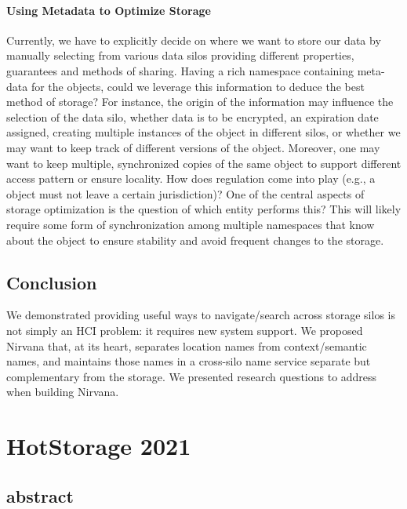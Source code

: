 \paragraph{Using Metadata to Optimize Storage}
Currently, we have to explicitly decide on where we want to store our data by manually selecting from various data silos providing different properties, guarantees and methods of sharing.
Having a rich namespace containing meta-data for the objects, could we leverage this information to deduce the best method of storage?
For instance, the origin of the information may influence the selection of the data silo, whether data is to be encrypted, an expiration date assigned, creating multiple instances of the object in different silos, or whether we may want to keep track of different versions of the object.
Moreover, one may want to keep multiple, synchronized copies of the same object to support different access pattern or ensure locality.
How does regulation come into play (e.g., a object must not leave a certain jurisdiction)?
One of the central aspects of storage optimization is the question of which entity performs this?
This will likely require some form of synchronization among multiple namespaces that know about the object to ensure stability and avoid frequent changes to the storage.

\subsection{Conclusion}
\label{hotos21:conclusion}

We demonstrated providing useful ways to navigate/search across storage silos is not simply an HCI problem: it requires new system support.
We proposed Nirvana that, at its heart, separates location names from context/semantic names, and maintains those names in a cross-silo
name service separate but complementary from the storage. We presented research questions to address when building Nirvana.


\section{HotStorage 2021}
\label{ch:appendix:section:hotstorage21}

\subsection{abstract}

